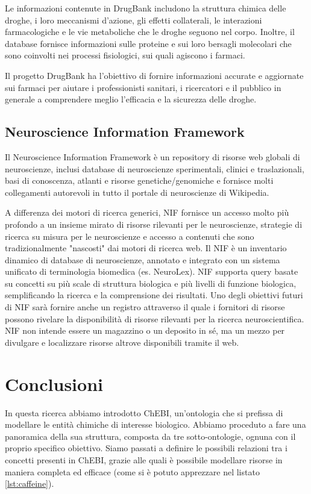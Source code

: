 \documentclass[12pt,a4paper,openright,twoside]{book}
\begin{document}
Le informazioni contenute in DrugBank includono la struttura chimica delle droghe, i loro meccanismi d'azione, gli effetti collaterali, le interazioni farmacologiche e le vie metaboliche che le droghe seguono nel corpo. Inoltre, il database fornisce informazioni sulle proteine e sui loro bersagli molecolari che sono coinvolti nei processi fisiologici, sui quali agiscono i farmaci.

Il progetto DrugBank ha l'obiettivo di fornire informazioni accurate e aggiornate sui farmaci per aiutare i professionisti sanitari, i ricercatori e il pubblico in generale a comprendere meglio l'efficacia e la sicurezza delle droghe.

\section{Neuroscience Information Framework}
Il Neuroscience Information Framework è un repository di risorse web globali di neuroscienze, inclusi database di neuroscienze sperimentali, clinici e traslazionali, basi di conoscenza, atlanti e risorse genetiche/genomiche e fornisce molti collegamenti autorevoli in tutto il portale di neuroscienze di Wikipedia.

A differenza dei motori di ricerca generici, NIF fornisce un accesso molto più profondo a un insieme mirato di risorse rilevanti per le neuroscienze, strategie di ricerca su misura per le neuroscienze e accesso a contenuti che sono tradizionalmente "nascosti" dai motori di ricerca web. Il NIF è un inventario dinamico di database di neuroscienze, annotato e integrato con un sistema unificato di terminologia biomedica (es. NeuroLex). NIF supporta query basate su concetti su più scale di struttura biologica e più livelli di funzione biologica, semplificando la ricerca e la comprensione dei risultati. Uno degli obiettivi futuri di NIF sarà fornire anche un registro attraverso il quale i fornitori di risorse possono rivelare la disponibilità di risorse rilevanti per la ricerca neuroscientifica. NIF non intende essere un magazzino o un deposito in sé, ma un mezzo per divulgare e localizzare risorse altrove disponibili tramite il web.
\chapter{Conclusioni}
\label{chap:conclusions}
In questa ricerca abbiamo introdotto ChEBI, un'ontologia che si prefissa di modellare le entità chimiche di interesse biologico. Abbiamo proceduto a fare una panoramica della sua struttura, composta da tre sotto-ontologie, ognuna con il proprio specifico obiettivo. Siamo passati a definire le possibili relazioni tra i concetti presenti in ChEBI, grazie alle quali è possibile modellare risorse in maniera completa ed efficace (come si è potuto apprezzare nel listato \ref{lst:caffeine}). 
\end{document}
